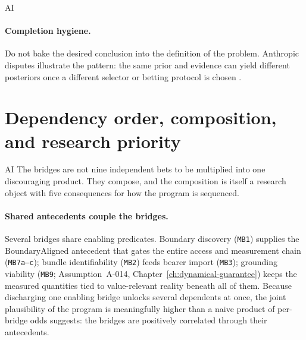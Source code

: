 \begin{authbar}{AI}
\paragraph{Completion hygiene.}
Do not bake the desired conclusion into the definition of the problem.
Anthropic disputes illustrate the pattern: the same prior and evidence can yield different posteriors once a different selector or betting protocol is chosen \autocite{zarncke2026anthropics}.

\end{authbar}
\authbarneedspace
\section{Dependency order, composition, and research priority}
\label{sec:research-dependency-order}
\begin{authbar}{AI}
The bridges are not nine independent bets to be multiplied into one discouraging product.
They compose, and the composition is itself a research object with five consequences for how the program is sequenced.

\paragraph{Shared antecedents couple the bridges.}
Several bridges share enabling predicates.
Boundary discovery (\texttt{MB1}) supplies the \(\mathrm{BoundaryAligned}\) antecedent that gates the entire access and measurement chain (\texttt{MB7a--c}); bundle identifiability (\texttt{MB2}) feeds bearer import (\texttt{MB3}); grounding viability (\texttt{MB9}; Assumption~A-014, Chapter~\ref{ch:dynamical-guarantee}) keeps the measured quantities tied to value-relevant reality beneath all of them.
Because discharging one enabling bridge unlocks several dependents at once, the joint plausibility of the program is meaningfully higher than a naive product of per-bridge odds suggests: the bridges are positively correlated through their antecedents.


\end{authbar}

